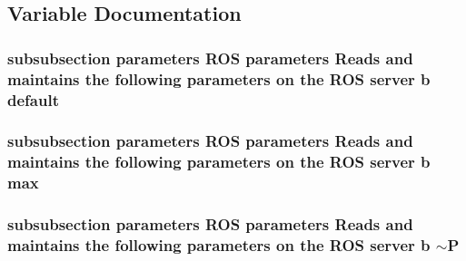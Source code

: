 \subsection{Variable Documentation}
\hypertarget{NubotGazeboConfig_8dox_a94d02332ecf13e7845f06fe8c343e101}{
\subsubsection[{default}]{\setlength{\rightskip}{0pt plus 5cm}subsubsection parameters R\-O\-S parameters Reads and maintains the following parameters on the R\-O\-S server b default}}\label{NubotGazeboConfig_8dox_a94d02332ecf13e7845f06fe8c343e101}
\hypertarget{NubotGazeboConfig_8dox_a55c9de72d9f3630abdf51bfe39c191dd}{
\subsubsection[{max}]{\setlength{\rightskip}{0pt plus 5cm}subsubsection parameters R\-O\-S parameters Reads and maintains the following parameters on the R\-O\-S server b max}}\label{NubotGazeboConfig_8dox_a55c9de72d9f3630abdf51bfe39c191dd}
\hypertarget{NubotGazeboConfig_8dox_a0877f4459572b3f982a7df3e47017639}{
\subsubsection[{$\sim$\-P}]{\setlength{\rightskip}{0pt plus 5cm}subsubsection parameters R\-O\-S parameters Reads and maintains the following parameters on the R\-O\-S server b $\sim$P}}\label{NubotGazeboConfig_8dox_a0877f4459572b3f982a7df3e47017639}
